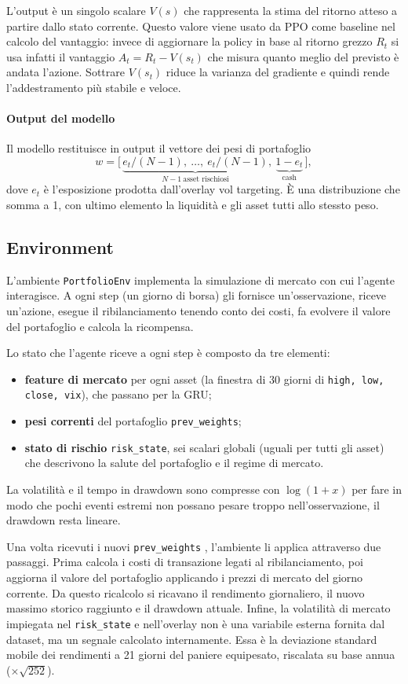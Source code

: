 L'output è un singolo scalare $V(s)$ che rappresenta la stima del ritorno atteso a partire dallo stato corrente. 
Questo valore viene usato da PPO come baseline nel calcolo del vantaggio: invece di aggiornare la policy in base al ritorno grezzo $R_t$ si usa infatti il vantaggio $A_t = R_t - V(s_t)$ che misura quanto meglio del previsto è andata l'azione. 
Sottrare $V(s_t)$ riduce la varianza del gradiente e quindi rende l'addestramento più stabile e veloce. 

\paragraph{Output del modello}
Il modello restituisce in output il vettore dei pesi di portafoglio \[
w = \big[\, \underbrace{e_t/(N-1),\ \dots,\ e_t/(N-1)}_{N-1\ \text{asset rischiosi}},\ \underbrace{1 - e_t}_{\text{cash}} \,\big],
\] dove $e_t$ è l'esposizione prodotta dall'overlay vol targeting. È una distribuzione che somma a 1, con ultimo elemento la liquidità e gli asset tutti allo stessto peso.

\subsection{Environment}
L'ambiente \lstinline{PortfolioEnv} implementa la simulazione di mercato con cui l'agente interagisce. 
A ogni step (un giorno di borsa) gli fornisce un'osservazione, riceve un'azione, esegue il ribilanciamento tenendo conto dei costi, fa evolvere il valore del portafoglio e calcola la ricompensa.


Lo stato che l'agente riceve a ogni step è composto da tre elementi:
\begin{itemize}
    \item \textbf{feature di mercato} per ogni asset (la finestra di 30
    giorni di \lstinline{high, low, close, vix}), che passano per la GRU;
    \item \textbf{pesi correnti} del portafoglio \lstinline{prev_weights};
    \item \textbf{stato di rischio} \lstinline{risk_state}, sei scalari
    globali (uguali per tutti gli asset) che descrivono la salute del portafoglio e il regime di
    mercato.
\end{itemize}
La volatilità e il tempo in drawdown sono compresse con $\log(1+x)$ per fare in modo che pochi eventi estremi non possano pesare troppo nell'osservazione, il drawdown resta lineare.


Una volta ricevuti i nuovi \lstinline{prev_weights} , l'ambiente li applica attraverso due passaggi. 
Prima calcola i costi di transazione legati al ribilanciamento, poi aggiorna il valore del portafoglio applicando i prezzi di mercato del giorno corrente.
Da questo ricalcolo si ricavano il rendimento giornaliero, il nuovo massimo storico raggiunto e il drawdown attuale. 
Infine, la volatilità di mercato impiegata nel \lstinline{risk_state} e nell'overlay non è una variabile esterna fornita dal dataset, ma un segnale calcolato internamente. 
Essa è la deviazione standard mobile dei rendimenti a 21 giorni del paniere equipesato, riscalata su base annua ($\times\sqrt{252}$).

